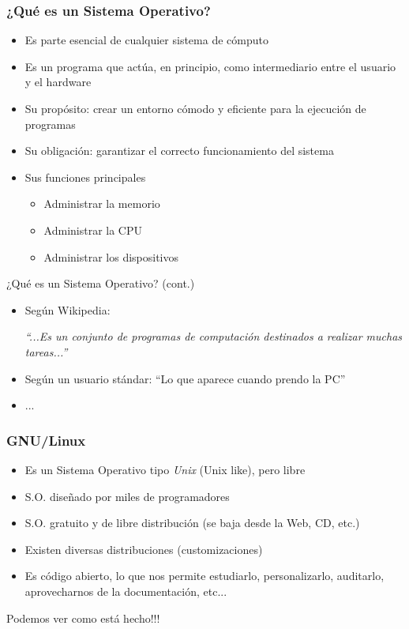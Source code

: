 \begin{frame}
  \frametitle{¿Qué es un Sistema Operativo?}
  \begin{itemize}
	  \item Es parte esencial de cualquier sistema de cómputo
	  \item Es un programa que actúa, en principio, como intermediario entre el usuario y el hardware
	  \item Su propósito: crear un entorno cómodo y eficiente para la ejecución de programas
	  \item Su obligación: garantizar el correcto funcionamiento del sistema
	  \item Sus funciones principales
		  \begin{itemize}
			  \item Administrar la memorio
			  \item Administrar la CPU
			  \item Administrar los dispositivos
		  \end{itemize}
  \end{itemize}
\end{frame}

\begin{frame}{¿Qué es un Sistema Operativo? (cont.)}
  \begin{itemize}
  \item Según Wikipedia:
  
   \textit{``...Es un conjunto de programas de computación destinados a realizar muchas tareas...''}
  \item Según un usuario stándar: ``Lo que aparece cuando prendo la PC''
  \item ...
  \end{itemize}
\end{frame}

\begin{frame}
	\frametitle{GNU/Linux}
	\begin{itemize}
		\item Es un Sistema Operativo tipo \textit{Unix} (Unix like), pero libre
		\item S.O. diseñado por miles de programadores
		\item S.O. gratuito y de libre distribución (se baja desde la Web, CD, etc.)
		\item Existen diversas distribuciones (customizaciones)
		\item \alert{Es código abierto}, lo que nos permite estudiarlo, personalizarlo, auditarlo, aprovecharnos de la documentación, etc...
	\end{itemize}
	\centerline{\alert{Podemos ver como está hecho!!!}}
\end{frame}

